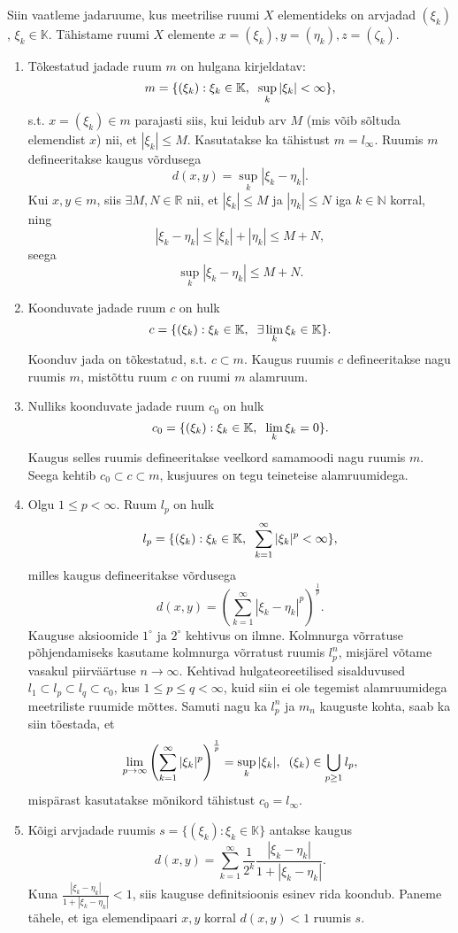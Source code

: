 \documentclass{article}[12pt]
\newcommand{\h}{\hspace{0.2cm}}
\newcommand{\R}{\mathbb{R}}
\newcommand{\N}{\mathbb{N}}
\newcommand{\K}{\mathbb{K}}
\theoremstyle{definition}
\theoremstyle{definition}
\theoremstyle{definition}
\theoremstyle{break}
\begin{document}
Siin vaatleme jadaruume, kus meetrilise ruumi $X$ elementideks on arvjadad $(\xi_k)$, $\xi_k\in\K$.
Tähistame ruumi $X$ elemente $x=(\xi_k),y=(\eta_k),z=(\zeta_k)$.
\begin{enumerate}
	\item Tõkestatud jadade ruum $m$ on hulgana kirjeldatav:
	\[
		m=\{ (\xi_k):\xi_k\in\K,\h\sup_k |\xi_k|<\infty \},
	\]
	s.t. $x=(\xi_k)\in m$ parajasti siis, kui leidub arv $M$ (mis võib sõltuda elemendist $x$) nii, et $|\xi_k|\leq M$.
	Kasutatakse ka tähistust $m=l_\infty$.
	Ruumis $m$ defineeritakse kaugus võrdusega
	\[
		d(x,y) = \sup_k |\xi_k-\eta_k|.
	\]
	Kui $x,y\in m$, siis $\exists M,N\in\R$ nii, et $|\xi_k|\leq M$ ja $|\eta_k|\leq N$ iga $k\in\N$ korral, ning
	\[
		|\xi_k-\eta_k|\leq |\xi_k|+|\eta_k|\leq M+N,
	\]
	seega
	\[
		\sup_k |\xi_k-\eta_k| \leq M+N.
	\]
	\item Koonduvate jadade ruum $c$ on hulk
	\[
		c=\{ (\xi_k):\xi_k\in\K,\h\exists\lim_k \xi_k\in\K \}.
	\]
	Koonduv jada on tõkestatud, s.t. $c\subset m$.
	Kaugus ruumis $c$ defineeritakse nagu ruumis $m$, mistõttu ruum $c$ on ruumi $m$ alamruum.
	\item Nulliks koonduvate jadade ruum $c_0$ on hulk
	\[
		c_0= \{ (\xi_k):\xi_k\in\K,\h\lim_k\xi_k = 0 \}.
	\]
	Kaugus selles ruumis defineeritakse veelkord samamoodi nagu ruumis $m$.
	Seega kehtib $c_0\subset c\subset m$, kusjuures on tegu teineteise alamruumidega.
	\item Olgu $1\leq p < \infty$. 
	Ruum $l_p$ on hulk
	\[
		l_p = \{ (\xi_k):\xi_k\in\K,\h \sum_{k=1}^\infty |\xi_k|^p < \infty \},
	\]
	milles kaugus defineeritakse võrdusega
	\[
		d(x,y) = \left( \sum_{k=1}^\infty |\xi_k-\eta_k|^p \right)^{\frac{1}{p}}.
	\]
	Kauguse aksioomide $1^\circ$ ja $2^\circ$ kehtivus on ilmne.
	Kolmnurga võrratuse põhjendamiseks kasutame kolmnurga võrratust ruumis $l_p^n$, misjärel võtame vasakul piirväärtuse $n\rightarrow \infty$.
	Kehtivad hulgateoreetilised sisalduvused $l_1\subset l_p \subset l_q \subset c_0$, kus $1\leq p \leq q < \infty$, kuid siin ei ole tegemist alamruumidega meetriliste ruumide mõttes.
	Samuti nagu ka $l_p^n$ ja $m_n$ kauguste kohta, saab ka siin tõestada, et
	\[
		\lim_{p\rightarrow \infty} \left( \sum_{k=1}^\infty |\xi_k|^p \right)^{\frac{1}{p}} = \sup_k |\xi_k|,\h (\xi_k)\in \bigcup_{p\geq 1} l_p,
	\]
	mispärast kasutatakse mõnikord tähistust $c_0=l_\infty$.
	\item Kõigi arvjadade ruumis $s = \{ (\xi_k):\xi_k\in \K \}$ antakse kaugus
	\[
		d(x,y) = \sum_{k=1}^\infty \frac{1}{2^k} \frac{ |\xi_k-\eta_k| }{1 + |\xi_k-\eta_k| }.
	\]
	Kuna $\frac{ |\xi_k-\eta_k| }{1 + |\xi_k-\eta_k| } < 1$, siis kauguse definitsioonis esinev rida koondub. Paneme tähele, et iga elemendipaari $x,y$ korral $d(x,y)<1$ ruumis $s$.


\end{enumerate}
\end{document}
